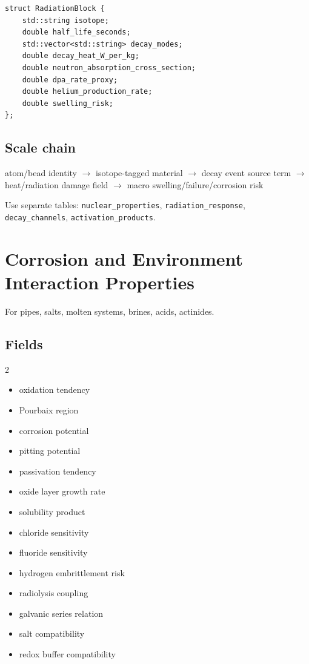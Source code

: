 \documentclass[11pt, a4paper]{article}
\begin{document}
\begin{lstlisting}
struct RadiationBlock {
    std::string isotope;
    double half_life_seconds;
    std::vector<std::string> decay_modes;
    double decay_heat_W_per_kg;
    double neutron_absorption_cross_section;
    double dpa_rate_proxy;
    double helium_production_rate;
    double swelling_risk;
};
\end{lstlisting}

\subsection{Scale chain}

\begin{center}
atom/bead identity $\rightarrow$ isotope-tagged material $\rightarrow$ decay event source term $\rightarrow$ heat/radiation damage field $\rightarrow$ macro swelling/failure/corrosion risk
\end{center}

Use separate tables: \texttt{nuclear\_properties}, \texttt{radiation\_response}, \texttt{decay\_channels}, \texttt{activation\_products}.

\section{Corrosion and Environment Interaction Properties}

For pipes, salts, molten systems, brines, acids, actinides.

\subsection{Fields}

\begin{multicols}{2}
\begin{itemize}[itemsep=1pt, leftmargin=*]
  \item oxidation tendency
  \item Pourbaix region
  \item corrosion potential
  \item pitting potential
  \item passivation tendency
  \item oxide layer growth rate
  \item solubility product
  \item chloride sensitivity
  \item fluoride sensitivity
  \item hydrogen embrittlement risk
  \item radiolysis coupling
  \item galvanic series relation
  \item salt compatibility
  \item redox buffer compatibility
\end{itemize}
\end{multicols}
\end{document}
